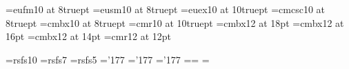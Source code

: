 








                                                     

\loadeufb     %
\loadeufm     %
\loadeusm     %
\loadeusb     %
\loadeurm     %
\loadeurb     %

\font\footmi=eufm10 at 8truept
\font\footsu=eusm10 at 8truept
\font\footex=euex10 at 10truept
\font\footsc=cmcsc10 at 8truept
\font\footbf=cmbx10 at 8truept
\font\footrm=cmr10 at 10truept
\font\Bigbf=cmbx12 at 18pt
\font\bigbf=cmbx12 at 16pt
\font\medbf=cmbx12 at 14pt
\font\medrm=cmr12 at 12pt

\font\tenscr=rsfs10
\font\sevenscr=rsfs7
\font\fivescr=rsfs5
\skewchar\tenscr='177 \skewchar\sevenscr='177 \skewchar\fivescr='177
\newfam\scrfam \textfont\scrfam=\tenscr \scriptfont\scrfam=\sevenscr
\scriptscriptfont\scrfam=\fivescr
\def\scr#1{{\fam\scrfam#1}}






